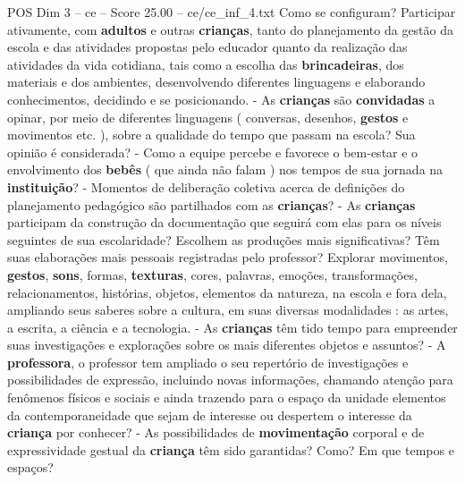 \begin{textsample}{POS Dim 3 – ce – Score 25.00 – ce/ce\_inf\_4.txt}
Como se configuram?
Participar ativamente, com \textbf{adultos} e outras \textbf{crianças}, tanto do planejamento da gestão da escola e das atividades propostas pelo educador quanto da realização das atividades da vida cotidiana, tais como a escolha das \textbf{brincadeiras}, dos materiais e dos ambientes, desenvolvendo diferentes linguagens e elaborando conhecimentos, decidindo e se posicionando. - As \textbf{crianças} são \textbf{convidadas} a opinar, por meio de diferentes linguagens ( conversas, desenhos, \textbf{gestos} e movimentos etc. ), sobre a qualidade do tempo que passam na escola?
Sua opinião é considerada? - Como a equipe percebe e favorece o bem-estar e o envolvimento dos \textbf{bebês} ( que ainda não falam ) nos tempos de sua jornada na \textbf{instituição}? - Momentos de deliberação coletiva acerca de definições do planejamento pedagógico são partilhados com as \textbf{crianças}? - As \textbf{crianças} participam da construção da documentação que seguirá com elas para os níveis seguintes de sua escolaridade?
Escolhem as produções mais significativas?
Têm suas elaborações mais pessoais registradas pelo professor?
Explorar movimentos, \textbf{gestos}, \textbf{sons}, formas, \textbf{texturas}, cores, palavras, emoções, transformações, relacionamentos, histórias, objetos, elementos da natureza, na escola e fora dela, ampliando seus saberes sobre a cultura, em suas diversas modalidades : as artes, a escrita, a ciência e a tecnologia. - As \textbf{crianças} têm tido tempo para empreender suas investigações e explorações sobre os mais diferentes objetos e assuntos? - A \textbf{professora}, o professor tem ampliado o seu repertório de investigações e possibilidades de expressão, incluindo novas informações, chamando atenção para fenômenos físicos e sociais e ainda trazendo para o espaço da unidade elementos da contemporaneidade que sejam de interesse ou despertem o interesse da \textbf{criança} por conhecer? - As possibilidades de \textbf{movimentação} corporal e de expressividade gestual da \textbf{criança} têm sido garantidas?
Como?
Em que tempos e espaços?

\end{textsample}
